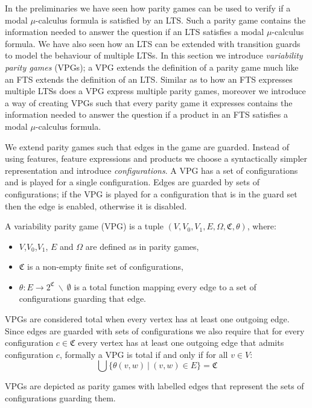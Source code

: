 In the preliminaries we have seen how parity games can be used to verify if a modal $\mu$-calculus formula is satisfied by an LTS. Such a parity game contains the information needed to answer the question if an LTS satisfies a  modal $\mu$-calculus formula. We have also seen how an LTS can be extended with transition guards to model the behaviour of multiple LTSs. In this section we introduce \textit{variability parity games} (VPGs); a VPG extends the definition of a parity game much like an FTS extends the definition of an LTS. Similar as to how an FTS expresses multiple LTSs does a VPG express multiple parity games, moreover we introduce a way of creating VPGs such that every parity game it expresses contains the information needed to answer the question if a product in an FTS satisfies a modal $\mu$-calculus formula.

We extend parity games such that edges in the game are guarded. Instead of using features, feature expressions and products we choose a syntactically simpler representation and introduce \textit{configurations}. A VPG has a set of configurations and is played for a single configuration. Edges are guarded by sets of configurations; if the VPG is played for a configuration that is in the guard set then the edge is enabled, otherwise it is disabled.

\begin{definition}
	\label{def_VPG}
	A variability parity game (VPG) is a tuple $(V,V_0, V_1, E, \Omega, \mathfrak{C}, \theta)$, where:
	\begin{itemize}
		\item $V$,$V_0$,$V_1$, $E$ and $\Omega$ are defined as in parity games,
		\item $\mathfrak{C}$ is a non-empty finite set of configurations,
		\item $\theta : E \rightarrow 2^\mathfrak{C}\ \backslash\ \emptyset$ is a total function mapping every edge to a set of configurations guarding that edge.
	\end{itemize}
\end{definition}
VPGs are considered total when every vertex has at least one outgoing edge. Since edges are guarded with sets of configurations we also require that for every configuration $c \in \mathfrak{C}$ every vertex has at least one outgoing edge that admits configuration $c$, formally a VPG is total if and only if for all $v \in V$:
\[ \bigcup\{\theta(v,w)\ |\ (v,w) \in E\} = \mathfrak{C} \]

VPGs are depicted as parity games with labelled edges that represent the sets of configurations guarding them.

